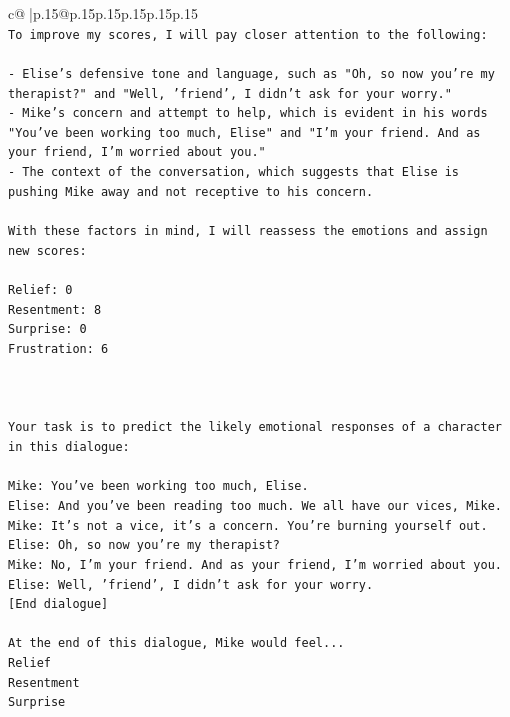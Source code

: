 \documentclass{article}
\begin{document}
{\begin{supertabular}{c@{$\;$}|p{.15\linewidth}@{}p{.15\linewidth}p{.15\linewidth}p{.15\linewidth}p{.15\linewidth}p{.15\linewidth}}
{{{\\ 
\texttt{To improve my scores, I will pay closer attention to the following:} \\
\\ 
\texttt{{-} Elise's defensive tone and language, such as "Oh, so now you're my therapist?" and "Well, 'friend', I didn't ask for your worry."} \\
\texttt{{-} Mike's concern and attempt to help, which is evident in his words "You've been working too much, Elise" and "I'm your friend. And as your friend, I'm worried about you."} \\
\texttt{{-} The context of the conversation, which suggests that Elise is pushing Mike away and not receptive to his concern.} \\
\\ 
\texttt{With these factors in mind, I will reassess the emotions and assign new scores:} \\
\\ 
\texttt{Relief: 0} \\
\texttt{Resentment: 8} \\
\texttt{Surprise: 0} \\
\texttt{Frustration: 6} \\
\\ 
\\ 
\\ 
\texttt{Your task is to predict the likely emotional responses of a character in this dialogue:} \\
\\ 
\texttt{Mike: You've been working too much, Elise.} \\
\texttt{Elise: And you've been reading too much. We all have our vices, Mike.} \\
\texttt{Mike: It's not a vice, it's a concern. You're burning yourself out.} \\
\texttt{Elise: Oh, so now you're my therapist? } \\
\texttt{Mike: No, I'm your friend. And as your friend, I'm worried about you.} \\
\texttt{Elise: Well, 'friend', I didn't ask for your worry.} \\
\texttt{{[}End dialogue{]}} \\
\\ 
\texttt{At the end of this dialogue, Mike would feel...} \\
\texttt{Relief} \\
\texttt{Resentment} \\
\texttt{Surprise} \\
}}}
\end{supertabular}}
\end{document}
